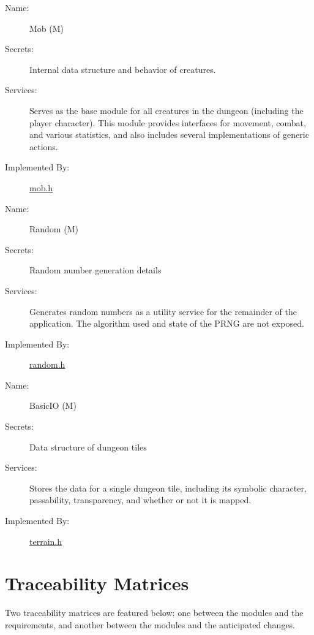 \documentclass[12pt, titlepage]{article}
\newcommand{\newSection}[1]{
  \newpage
  \section{#1}
}
\newcounter{mnum}
\newcommand{\mdprint}[1]{\addtocounter{mnum}{1} #1 (M\themnum)}
\begin{document}
        \bigskip\begin{description}
            \item[Name:]\mdprint{Mob}
            \item[Secrets:]Internal data structure and behavior of creatures.
            \item[Services:]Serves as the base module for all creatures in the dungeon (including the player character).  This module provides interfaces for movement, combat, and various statistics, and also includes several implementations of generic actions.
            \item[Implemented By:]\href{run:../../../src/include/mob.h}{mob.h}
        \end{description}

        \bigskip\begin{description}
            \item[Name:]\mdprint{Random}
            \item[Secrets:]Random number generation details
            \item[Services:]Generates random numbers as a utility service for the remainder of the application.  The algorithm used and state of the PRNG are not exposed.
            \item[Implemented By:]\href{run:../../../src/include/random.h}{random.h}
        \end{description}

        \bigskip\begin{description}
            \item[Name:]\mdprint{BasicIO}
            \item[Secrets:]Data structure of dungeon tiles
            \item[Services:]Stores the data for a single dungeon tile, including its symbolic character, passability, transparency, and whether or not it is mapped.
            \item[Implemented By:]\href{run:../../../src/include/terrain.h}{terrain.h}
        \end{description}

\newSection{Traceability Matrices} \label{SecTM}

    Two traceability matrices are featured below: one between the modules and the requirements, and another between the modules and the anticipated changes.
\end{document}
